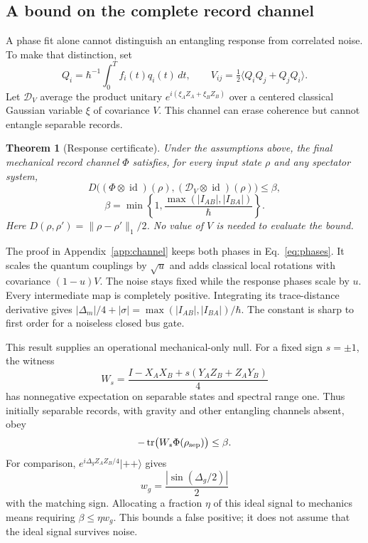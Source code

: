 \documentclass[aps,pra,reprint,amsmath,amssymb,longbibliography,floatfix]{revtex4-2}
\newtheorem{theorem}{Theorem}
\newcommand{\tr}{\operatorname{tr}}
\newcommand{\id}{\operatorname{id}}
\newcommand{\norm}[1]{\lVert#1\rVert}
\newcommand{\ket}[1]{\lvert#1\rangle}
\newcommand{\DV}{\mathcal D_V}
\begin{document}
\subsection{A bound on the complete record channel}
A phase fit alone cannot distinguish an entangling response from correlated noise. To make that distinction, set
\begin{equation}
Q_i=\hbar^{-1}\int_0^T f_i(t)q_i(t)\,dt,\qquad
V_{ij}=\tfrac12\langle Q_iQ_j+Q_jQ_i\rangle.
\label{eq:V}
\end{equation}
Let $\DV$ average the product unitary $e^{i(\xi_AZ_A+\xi_BZ_B)}$ over a centered classical Gaussian variable $\xi$ of covariance $V$. This channel can erase coherence but cannot entangle separable records.

\begin{theorem}[Response certificate]
Under the assumptions above, the final mechanical record channel $\Phi$ satisfies, for every input state $\rho$ and any spectator system,
\begin{equation}
D\bigl((\Phi\otimes\id)(\rho),(\DV\otimes\id)(\rho)\bigr)\le\beta,
\label{eq:certificate}
\end{equation}
\begin{equation}
\beta=\min\left\{1,\frac{\max(|I_{AB}|,|I_{BA}|)}{\hbar}\right\}.
\label{eq:beta}
\end{equation}
Here $D(\rho,\rho')=\norm{\rho-\rho'}_1/2$. No value of $V$ is needed to evaluate the bound.
\end{theorem}

The proof in Appendix~\ref{app:channel} keeps both phases in Eq.~\eqref{eq:phases}. It scales the quantum couplings by $\sqrt u$ and adds classical local rotations with covariance $(1-u)V$. The noise stays fixed while the response phases scale by $u$. Every intermediate map is completely positive. Integrating its trace-distance derivative gives $|\Delta_m|/4+|\sigma|=\max(|I_{AB}|,|I_{BA}|)/\hbar$. The constant is sharp to first order for a noiseless closed bus gate.

This result supplies an operational mechanical-only null. For a fixed sign $s=\pm1$, the witness
\begin{equation}
W_s=\frac{I-X_AX_B+s(Y_AZ_B+Z_AY_B)}4
\label{eq:witness}
\end{equation}
has nonnegative expectation on separable states and spectral range one. Thus initially separable records, with gravity and other entangling channels absent, obey
\begin{equation}
-\tr\bigl(W_s\Phi(\rho_{\rm sep})\bigr)\le\beta.
\label{eq:falsepositive}
\end{equation}
For comparison, $e^{i\Delta_g Z_AZ_B/4}\ket{++}$ gives
\begin{equation}
w_g=\frac{|\sin(\Delta_g/2)|}{2}
\label{eq:wg}
\end{equation}
with the matching sign. Allocating a fraction $\eta$ of this ideal signal to mechanics means requiring $\beta\le\eta w_g$. This bounds a false positive; it does not assume that the ideal signal survives noise.
\end{document}
